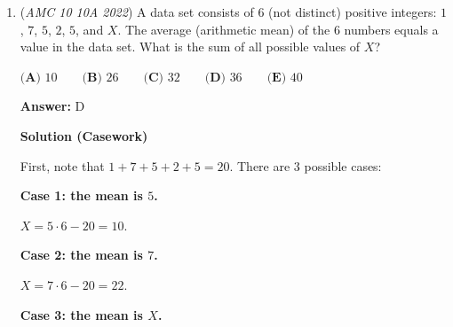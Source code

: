 \begin{enumerate}
 
            \begin{enumerate} 
        \item From the least common multiple condition, we have 
 \[\operatorname{lcm}(n,18) = \operatorname{lcm}(2^a\cdot3^b\cdot5^c,2\cdot3^2) = 2^{\max(a,1)}\cdot3^{\max(b,2)}\cdot5^{\max(c,0)} = 2^2\cdot3^2\cdot5,\] from which $a=2, b\in\{0,1,2\},$ and $c=1.$

        \item From the greatest common divisor condition, we have 
 \[\gcd(n,45) = \gcd(2^2\cdot3^b\cdot5,3^2\cdot5) = 2^{\min(2,0)}\cdot3^{\min(b,2)}\cdot5^{\min(1,1)} = 3\cdot5,\] from which $b=1.$

            \end{enumerate}
            Together, we conclude that $n=2^2\cdot3\cdot5=60.$ The sum of its digits is $6+0=\boxed{\textbf{(B) } 6}.$




\textbf{Solution 2}

The options for $\text{lcm}(x, 18)=180$ are $20$, $60$, and $180$. The options for $\text{gcd}(y, 45)=15$ are $15$, $30$, $60$, $75$, etc. We see that $60$ appears in both lists; therefore, $6+0=\boxed{\textbf{(B) } 6}$.

 \textbf{Remark} If you ignore or mess up the LCM, and get  $n=15$, you'll still get the correct answer.

 


	\item (\textit{AMC 10 10A 2022}) A data set consists of $6$ (not distinct) positive integers: $1$, $7$, $5$, $2$, $5$, and $X$. The average (arithmetic mean) of the $6$ numbers equals a value in the data set. What is the sum of all possible values of $X$?


 $\textbf{(A) } 10 \qquad \textbf{(B) } 26 \qquad \textbf{(C) } 32 \qquad \textbf{(D) } 36 \qquad \textbf{(E) } 40$

 \textbf{Answer: }D



\textbf{Solution (Casework)}

First, note that $1+7+5+2+5=20$. There are $3$ possible cases:

 \textbf{Case 1: the mean is $5$.}

 $X = 5 \cdot 6 - 20 = 10$.

 \textbf{Case 2: the mean is $7$.}

 $X = 7 \cdot 6 - 20 = 22$.

 \textbf{Case 3: the mean is $X$.}


\end{enumerate}
